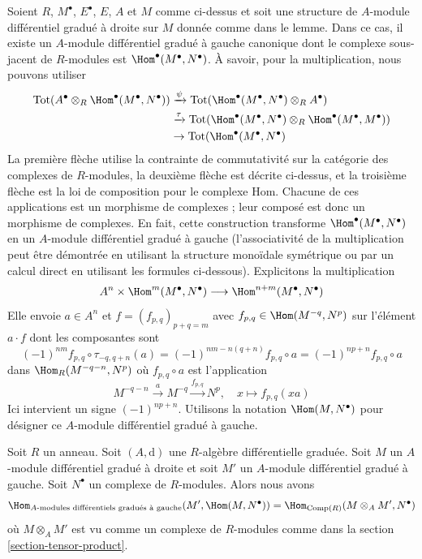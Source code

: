 \noindent
Soient $R$, $M^\bullet$, $E^\bullet$, $E$, $A$ et $M$ comme ci-dessus et
soit une structure de $A$-module différentiel gradué à droite sur $M$
donnée comme dans le lemme. Dans ce cas, il existe un $A$-module différentiel
gradué à gauche canonique dont le complexe sous-jacent de $R$-modules est
$\Hom^\bullet(M^\bullet, N^\bullet)$. À savoir, pour la multiplication, nous pouvons
utiliser
\begin{align*}
\text{Tot}(A^\bullet \otimes_R \Hom^\bullet(M^\bullet, N^\bullet))
& \xrightarrow{\psi}
\text{Tot}(\Hom^\bullet(M^\bullet, N^\bullet) \otimes_R A^\bullet) \\ &
\xrightarrow{\tau}
\text{Tot}(\Hom^\bullet(M^\bullet, N^\bullet) \otimes_R
\Hom^\bullet(M^\bullet, M^\bullet)) \\ &
\to
\text{Tot}(\Hom^\bullet(M^\bullet, N^\bullet)
\end{align*}
La première flèche utilise la contrainte de commutativité sur la catégorie
des complexes de $R$-modules, la deuxième flèche est décrite ci-dessus, et la
troisième flèche est la loi de composition pour le complexe Hom. Chacune de ces
applications est un morphisme de complexes ; leur composé est donc un morphisme
de complexes. En fait, cette construction transforme $\Hom^\bullet(M^\bullet,
N^\bullet)$ en un $A$-module différentiel gradué à gauche (l'associativité de la multiplication
peut être démontrée en utilisant la structure monoïdale symétrique ou par un calcul direct en
utilisant les formules ci-dessous). Explicitons la multiplication
$$
A^n \times \Hom^m(M^\bullet, N^\bullet) \longrightarrow
\Hom^{n + m}(M^\bullet, N^\bullet)
$$
Elle envoie $a \in A^n$
et $f = (f_{p, q})_{p + q = m}$ avec $f_{p, q} \in \Hom(M^{-q}, N^p)$ sur
l'élément $a \cdot f$ dont les composantes sont
$$
(-1)^{nm}f_{p, q} \circ \tau_{-q, q + n}(a) =
(-1)^{nm - n(q + n)}f_{p, q} \circ a =
(-1)^{np + n} f_{p, q} \circ a
$$
dans $\Hom_R(M^{-q - n}, N^p)$ où $f_{p, q} \circ a$ est l'application
$$
M^{-q - n} \xrightarrow{a} M^{-q} \xrightarrow{f_{p, q}} N^p,\quad
x \longmapsto f_{p, q}(xa)
$$
Ici intervient un signe $(-1)^{np + n}$. Utilisons la notation
$\Hom(M, N^\bullet)$ pour désigner ce $A$-module différentiel gradué à gauche.

\begin{lemma}
\label{lemma-characterize-hom-other-side}
Soit $R$ un anneau. Soit $(A, \text{d})$ une $R$-algèbre différentielle graduée.
Soit $M$ un $A$-module différentiel gradué à droite et soit
$M'$ un $A$-module différentiel gradué à gauche.
Soit $N^\bullet$ un complexe de $R$-modules. Alors nous avons
$$
\Hom_{\text{}A\text{-modules différentiels gradués à gauche}}(M', \Hom(M,
N^\bullet)) = \Hom_{\text{Comp}(R)}(M \otimes_A M', N^\bullet)
$$
où $M \otimes_A M'$ est vu comme un complexe de $R$-modules
comme dans la section \ref{section-tensor-product}.
\end{lemma}

